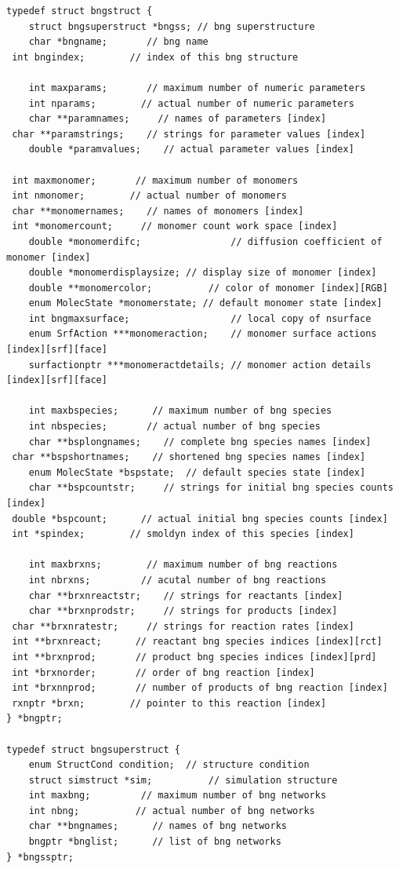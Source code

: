 \documentclass {scrbook}
\begin{document}
\begin{lstlisting}
typedef struct bngstruct {
	struct bngsuperstruct *bngss; // bng superstructure
	char *bngname;       // bng name
 int bngindex;        // index of this bng structure
 
	int maxparams;       // maximum number of numeric parameters
	int nparams;        // actual number of numeric parameters
	char **paramnames;     // names of parameters [index]
 char **paramstrings;    // strings for parameter values [index]
	double *paramvalues;    // actual parameter values [index]
 
 int maxmonomer;       // maximum number of monomers
 int nmonomer;        // actual number of monomers
 char **monomernames;    // names of monomers [index]
 int *monomercount;     // monomer count work space [index]
	double *monomerdifc;				// diffusion coefficient of monomer [index]
	double *monomerdisplaysize;	// display size of monomer [index]
	double **monomercolor;			// color of monomer [index][RGB]
	enum MolecState *monomerstate; // default monomer state [index]
	int bngmaxsurface;					// local copy of nsurface
	enum SrfAction ***monomeraction;	// monomer surface actions [index][srf][face]
	surfactionptr ***monomeractdetails;	// monomer action details [index][srf][face]

	int maxbspecies;      // maximum number of bng species
	int nbspecies;       // actual number of bng species
	char **bsplongnames;    // complete bng species names [index]
 char **bspshortnames;    // shortened bng species names [index]
	enum MolecState *bspstate;	// default species state [index]
	char **bspcountstr;     // strings for initial bng species counts [index]
 double *bspcount;      // actual initial bng species counts [index]
 int *spindex;        // smoldyn index of this species [index]

	int maxbrxns;        // maximum number of bng reactions
	int nbrxns;         // acutal number of bng reactions
	char **brxnreactstr;    // strings for reactants [index]
	char **brxnprodstr;     // strings for products [index]
 char **brxnratestr;     // strings for reaction rates [index]
 int **brxnreact;      // reactant bng species indices [index][rct]
 int **brxnprod;       // product bng species indices [index][prd]
 int *brxnorder;       // order of bng reaction [index]
 int *brxnnprod;       // number of products of bng reaction [index]
 rxnptr *brxn;        // pointer to this reaction [index]
} *bngptr;

typedef struct bngsuperstruct {
	enum StructCond condition;	// structure condition
	struct simstruct *sim;			// simulation structure
	int maxbng;         // maximum number of bng networks
	int nbng;          // actual number of bng networks
	char **bngnames;      // names of bng networks
	bngptr *bnglist;      // list of bng networks
} *bngssptr;
\end{lstlisting}
\end{document}
